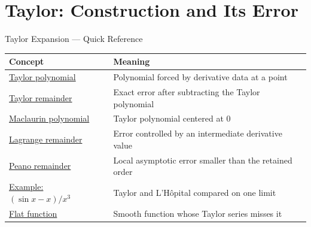 \section{Taylor: Construction and Its Error}

\begin{toolkitbox}{Taylor Expansion --- Quick Reference}
\small
\begin{tabular}{l l}
\toprule
\textbf{Concept} & \textbf{Meaning} \\
\midrule
\hyperref[def:taylor-polynomial-at-a-point]{Taylor polynomial} & Polynomial forced by derivative data at a point \\
\hyperref[def:taylor-remainder]{Taylor remainder} & Exact error after subtracting the Taylor polynomial \\
\hyperref[def:maclaurin-polynomial]{Maclaurin polynomial} & Taylor polynomial centered at \(0\) \\
\hyperref[thm:taylor-theorem-lagrange-remainder]{Lagrange remainder} & Error controlled by an intermediate derivative value \\
\hyperref[cor:taylor-expansion-peano-remainder]{Peano remainder} & Local asymptotic error smaller than the retained order \\
\hyperref[ex:sinx-limit]{Example: \((\sin x-x)/x^3\)} & Taylor and L'H\^{o}pital compared on one limit \\
\hyperref[prop:flat-function]{Flat function} & Smooth function whose Taylor series misses it \\
\bottomrule
\end{tabular}
\end{toolkitbox}



